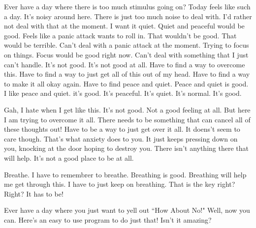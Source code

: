 Ever have a day where there is too much stimulus going on? Today feels like such
a day. It's noisy around here. There is just too much noise to deal with. I'd
rather not deal with that at the moment. I want it quiet. Quiet and peaceful
would be good. Feels like a panic attack wants to roll in. That wouldn't be
good. That would be terrible. Can't deal with a panic attack at the moment.
Trying to focus on things. Focus would be good right now. Can't deal with
something that I just can't handle. It's not good. It's not good at all. Have to
find a way to overcome this. Have to find a way to just get all of this out of
my head. Have to find a way to make it all okay again. Have to find peace and
quiet. Peace and quiet is good. I like peace and quiet. it's good. It's
peaceful. It's quiet. It's normal. It's good.

Gah, I hate when I get like this. It's not good. Not a good feeling at all. But
here I am trying to overcome it all. There needs to be something that can cancel
all of these thoughts out! Have to be a way to just get over it all. It doens't
seem to care though. That's what anxiety does to you. It just keeps pressing
down on you, knocking at the door hoping to destroy you. There isn't anything
there that will help. It's not a good place to be at all.

Breathe. I have to remembrer to breathe. Breathing is good. Breathing will help
me get through this. I have to just keep on breathing. That is the key right?
Right? It has to be!

Ever have a day where you just want to yell out ``How About No!" Well, now you
can. Here's an easy to use program to do just that! Isn't it amazing?

